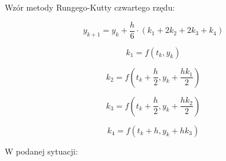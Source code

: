 \documentclass{article}
\begin{document}
	Wzór metody Rungego-Kutty czwartego rzędu:

	\begin{equation}
		y_{k+1} = y_k + \frac{h}{6} \cdot (k_1+2k_2+2k_3+k_4)
	\end{equation}

	\begin{equation}
		k_1 = f(t_k, y_k)
	\end{equation}

	\begin{equation}
		k_2 = f(t_k+\frac{h}{2}, y_k + \frac{hk_1}{2})
	\end{equation}

	\begin{equation}
		k_3 = f(t_k+\frac{h}{2}, y_k + \frac{hk_2}{2})
	\end{equation}

	\begin{equation}
		k_4 = f(t_k+h, y_k+hk_3)
	\end{equation}

	W podanej sytuacji:

	

	




	

	
	
	
\end{document}
